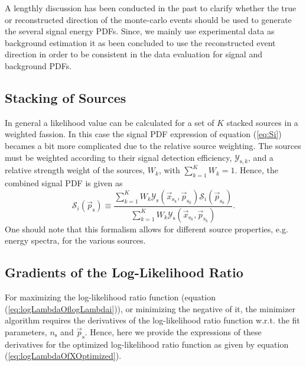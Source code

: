 \documentclass{article}
\newcommand{\ns}{n_{\mathrm{s}}}
\newcommand{\ps}{\vec{p}_{\mathrm{s}}}
\newcommand{\psk}{\vec{p}_{\mathrm{s}_k}}
\newcommand{\xsk}{\vec{x}_{\mathrm{s}_k}}
\begin{document}
A lengthly discussion has been conducted in the past to clarify whether the true or
reconstructed direction of the monte-carlo events should be used to generate
the several signal energy PDFs. Since, we mainly use experimental data as
background estimation it as been concluded to use the reconstructed event
direction in order to be consistent in the data evaluation for signal and
background PDFs.

\subsection{Stacking of Sources}

In general a likelihood value can be calculated for a set of $K$ stacked
sources in a weighted fassion. In this case the signal PDF expression of
equation (\ref{eq:Si}) becames a bit more complicated due to the relative
source weighting. The sources must be weighted according to their signal detection
efficiency, $\mathcal{Y}_{\mathrm{s},k}$, and a relative strength weight of the
sources, $W_k$, with $\sum_{k=1}^{K} W_k = 1$. Hence, the combined signal PDF is
given as
\begin{equation}
 \mathcal{S}_i(\ps) \equiv \frac{\sum_{k=1}^{K} W_k \mathcal{Y}_{\mathrm{s}}(\xsk,\psk) \mathcal{S}_{i}(\psk)}{\sum_{k=1}^{K}W_k\mathcal{Y}_{\mathrm{s}}(\xsk,\psk)}.
 \label{eq:SiStacking}
\end{equation}
One should note that this formalism allows for different source properties, e.g.
energy spectra, for the various sources.


\subsection{Gradients of the Log-Likelihood Ratio}

For maximizing the log-likelihood ratio function (equation (\ref{eq:logLambdaOflogLambdai})),
or minimizing the negative of it, the minimizer algorithm requires the
derivatives of the log-likelihood ratio function w.r.t. the fit parameters,
$\ns$ and $\ps$.
Hence, here we provide the expressions of these derivatives
for the optimized log-likelihood ratio function as given by equation
(\ref{eq:logLambdaOfXOptimized}).
\end{document}
